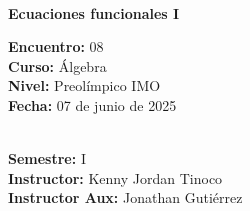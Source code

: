 \begin{center}
    \ \\
    \vspace{-4mm}
    \textbf{\Large Ecuaciones funcionales I}
\end{center}
\vspace{-5mm}
\begin{multicols}{2}
{
    \textbf{Encuentro:} 08\\
    \textbf{Curso:} Álgebra\\
    \textbf{Nivel:} Preolímpico IMO\\
    \textbf{Fecha:} 07 de junio de 2025\\
    \begin{flushright}
        \ \\
        \textbf{Semestre:} I\\
        \textbf{Instructor:} Kenny Jordan Tinoco\\
        \textbf{Instructor Aux:} Jonathan Gutiérrez
    \end{flushright}
}
\end{multicols}
\vspace{-4mm}

\thispagestyle{first-page-style}